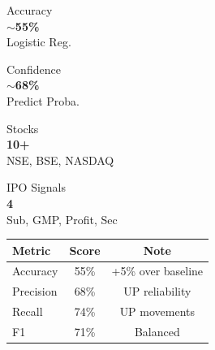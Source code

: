 \documentclass{article}
\newcommand{\sectionfont}{\fontsize{24}{28}\selectfont}
\newcommand{\bodyfont}{\fontsize{20}{24}\selectfont}
\newcommand{\smallfont}{\fontsize{18}{22}\selectfont}
\newcommand{\tinyfont}{\fontsize{15}{18}\selectfont}
\begin{document}
\begin{minipage}[t]{0.315\linewidth}
\begin{tcolorbox}[sbox, title={[7] Results \& Performance}]
\bodyfont
\noindent
\begin{minipage}[t]{0.48\linewidth}
  \begin{tcolorbox}[mblue]
    \smallfont\color{gray}Accuracy\\[3pt]
    {\sectionfont\bfseries\color{bwblue}$\sim$55\%}\\
    \tinyfont Logistic Reg.
  \end{tcolorbox}
\end{minipage}\hfill
\begin{minipage}[t]{0.48\linewidth}
  \begin{tcolorbox}[mteal]
    \smallfont\color{gray}Confidence\\[3pt]
    {\sectionfont\bfseries\color{bwblue}$\sim$68\%}\\
    \tinyfont Predict Proba.
  \end{tcolorbox}
\end{minipage}
\vspace{5pt}
\noindent
\begin{minipage}[t]{0.48\linewidth}
  \begin{tcolorbox}[mpurp]
    \smallfont\color{gray}Stocks\\[3pt]
    {\sectionfont\bfseries\color{bwblue}10+}\\
    \tinyfont NSE, BSE, NASDAQ
  \end{tcolorbox}
\end{minipage}\hfill
\begin{minipage}[t]{0.48\linewidth}
  \begin{tcolorbox}[moran]
    \smallfont\color{gray}IPO Signals\\[3pt]
    {\sectionfont\bfseries\color{bwblue}4}\\
    \tinyfont Sub, GMP, Profit, Sec
  \end{tcolorbox}
\end{minipage}
\vspace{6pt}

\renewcommand{\arraystretch}{1.2}
\begin{center}
\smallfont
\begin{tabular}{lcc}
\toprule
\textbf{Metric} & \textbf{Score} & \textbf{Note}\\
\midrule
Accuracy  & 55\% & +5\% over baseline\\
Precision & 68\% & UP reliability\\
Recall    & 74\% & UP movements\\
F1        & 71\% & Balanced\\
\bottomrule
\end{tabular}
\end{center}


\end{tcolorbox}
\end{minipage}
\end{document}
